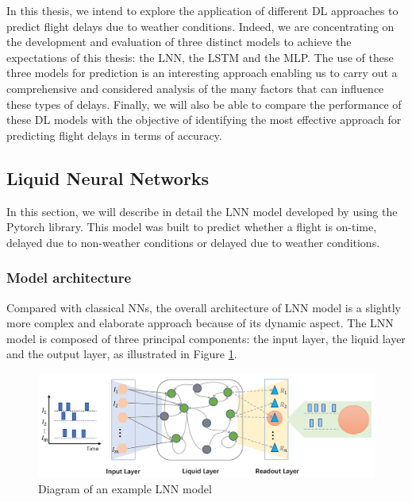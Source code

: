 \documentclass[12pt,oneside]{book} %
\begin{document}
\noindent In this thesis, we intend to explore the application of different DL approaches to predict flight delays due to weather conditions. Indeed, we are concentrating on the development and evaluation of three distinct models to achieve the expectations of this thesis: the LNN, the LSTM and the MLP. The use of these three models for prediction is an interesting approach enabling us to carry out a comprehensive and considered analysis of the many factors that can influence these types of delays. Finally, we will also be able to compare the performance of these DL models with the objective of identifying the most effective approach for predicting flight delays in terms of accuracy.

\subsection{Liquid Neural Networks}

\noindent In this section, we will describe in detail the LNN model developed by using the Pytorch library. This model was built to predict whether a flight is on-time, delayed due to non-weather conditions or delayed due to weather conditions.

\subsubsection{Model architecture}

\noindent Compared with classical NNs, the overall architecture of LNN model is a slightly more complex and elaborate approach because of its dynamic aspect. The LNN model is composed of three principal components: the input layer, the liquid layer and the output layer, as illustrated in Figure \ref{fig:LNN_model}.

\begin{figure}[H]
    \centering
    \includegraphics[width=\linewidth]{Image/LNN.png}
    \caption{\centering Diagram of an example LNN model}
    \label{fig:LNN_model}
\end{figure}
\end{document}
